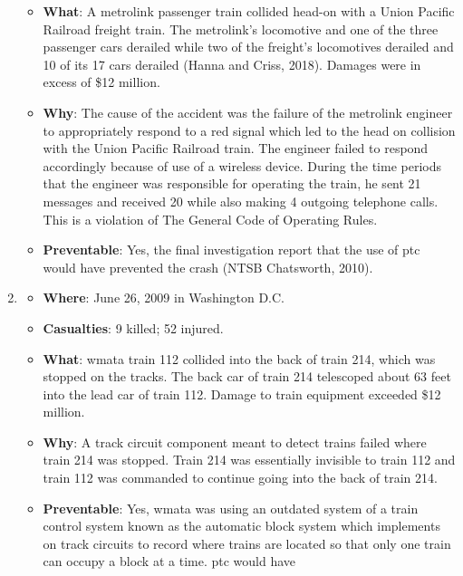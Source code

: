 \documentclass[11pt, titlepage]{article}
\begin{document}
\begin{enumerate}
\begin{itemize}
        \item \textbf{What}: A \gls{metrolink} passenger train collided head-on
        with a Union Pacific Railroad freight train. The \gls{metrolink}’s
        locomotive and one of the three passenger cars derailed while two of the
        freight’s locomotives derailed and 10 of its 17 cars derailed (Hanna and Criss,
        2018). Damages were in excess of \$12 million.
        \item \textbf{Why}: The cause of the accident was the failure of the
        \gls{metrolink} engineer to appropriately respond to a red signal which
        led to the head on collision with the Union Pacific Railroad train. The
        engineer failed to respond accordingly because of use of a wireless
        device. During the time periods that the engineer was responsible for
        operating the train, he sent 21 messages and received 20 while also
        making 4 outgoing telephone calls. This is a violation of The General
        Code of Operating Rules.
        \item \textbf{Preventable}: Yes, the final investigation report that the
        use of \gls{ptc} would have prevented the crash (NTSB Chatsworth, 2010).
    \end{itemize}
    \item
    \begin{itemize}
        \item \textbf{Where}: June 26, 2009 in Washington D.C.
        \item \textbf{Casualties}: 9 killed; 52 injured.
        \item \textbf{What}: \gls{wmata} train 112 collided into the back of
        train 214, which was stopped on the tracks. The back car of train 214
        telescoped about 63 feet into the lead car of train 112. Damage to train
        equipment exceeded \$12 million.
        \item \textbf{Why}: A track circuit component meant to detect trains
        failed where train 214 was stopped. Train 214 was essentially invisible
        to train 112 and train 112 was commanded to continue going into the back
        of train 214.
        \item \textbf{Preventable}: Yes, \gls{wmata} was using an outdated system
        of a train control system known as the automatic block system which
        implements on track circuits to record where trains are located so that
        only one train can occupy a block at a time. \gls{ptc} would have

\end{itemize}
\end{enumerate}
\end{document}
